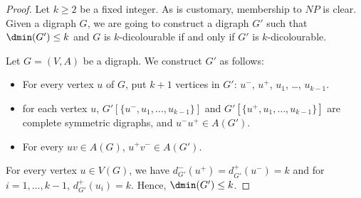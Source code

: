 \begin{proof}
Let $k \geq 2$ be a fixed integer. 
As is customary, membership to $NP$ is clear.
Given a digraph $G$, we are going to construct a digraph $G'$ such that $\dmin(G') \leq k$ and $G$ is $k$-dicolourable if and only if $G'$ is $k$-dicolourable. 


Let $G=(V, A)$ be a digraph. We construct $G'$ as follows:
\begin{itemize}
    \item For every vertex $u$ of $G$, put $k+1$ vertices in $G'$: $u^-$,  $u^+$, $u_1$, \dots, $u_{k-1}$.
    \item for each vertex $u$, $G'[\{u^-, u_1, \dots, u_{k-1}\}]$ and $G'[\{u^+, u_1, \dots, u_{k-1}\}]$ are complete symmetric digraphs, and $u^-u^+ \in A(G')$. 
    \item For every $uv \in A(G)$, $u^+v^- \in A(G')$. 
\end{itemize}

For every vertex $u \in V(G)$, we have $d_{G'}^-(u^+) =d_{G'}^+(u^-) = k$ and for $i=1, \dots, k-1$, $d^+_{G'}(u_i) = k$. Hence, $\dmin(G') \leq k$. 









\end{proof}
